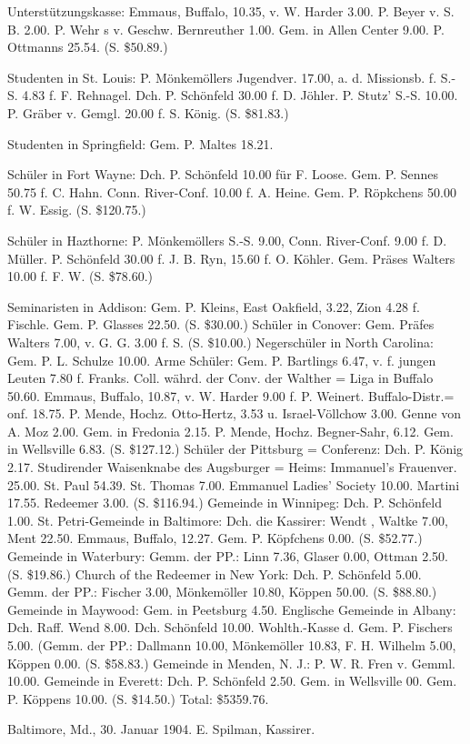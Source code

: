 Unterstützungskasse: Emmaus, Buffalo, 10.35, v. W. Harder 3.00. P. Beyer v. S. B. 2.00. P. Wehr s v. Geschw. Bernreuther 1.00. Gem. in Allen Center 9.00. P. Ottmanns 25.54. (S. \$50.89.)

Studenten in St. Louis: P. Mönkemöllers Jugendver. 17.00, a. d. Missionsb. f. S.-S. 4.83 f. F. Rehnagel. Dch. P. Schönfeld 30.00 f. D. Jöhler. P. Stutz’ S.-S. 10.00. P. Gräber v. Gemgl. 20.00 f. S. König. (S. \$81.83.)

Studenten in Springfield: Gem. P. Maltes 18.21.

Schüler in Fort Wayne: Dch. P. Schönfeld 10.00 für F. Loose. Gem. P. Sennes 50.75 f. C. Hahn. Conn. River-Conf. 10.00 f. A. Heine. Gem. P. Röpkchens 50.00 f. W. Essig. (S. \$120.75.)

Schüler in Hazthorne: P. Mönkemöllers S.-S. 9.00, Conn. River-Conf. 9.00 f. D. Müller. P. Schönfeld 30.00 f. J. B. Ryn, 15.60 f. O. Köhler. Gem. Präses Walters 10.00 f. F. W. (S. \$78.60.)


Seminaristen in Addison: Gem. P. Kleins, East Oakfield, 3.22, Zion 4.28 f. Fischle. Gem. P. Glasses 22.50. (S. \$30.00.)
Schüler in Conover: Gem. Präfes Walters 7.00, v. G. G. 3.00 f. S. (S. \$10.00.)
Negerschüler in North Carolina: Gem. P. L. Schulze 10.00.
Arme Schüler: Gem. P. Bartlings 6.47, v. f. jungen Leuten 7.80 f. Franks. Coll. währd. der Conv. der Walther = Liga in Buffalo 50.60. Emmaus, Buffalo, 10.87, v. W. Harder 9.00 f. P. Weinert. Buffalo-Distr.= onf. 18.75. P. Mende, Hochz. Otto-Hertz, 3.53 u. Israel-Völlchow 3.00. Genne von A. Moz 2.00. Gem. in Fredonia 2.15. P. Mende, Hochz. Begner-Sahr, 6.12. Gem. in Wellsville 6.83. (S. \$127.12.)
Schüler der Pittsburg = Conferenz: Dch. P. König 2.17.
Studirender Waisenknabe des Augsburger = Heims: Immanuel’s Frauenver. 25.00. St. Paul 54.39. St. Thomas 7.00. Emmanuel Ladies’ Society 10.00. Martini 17.55. Redeemer 3.00. (S. \$116.94.)
Gemeinde in Winnipeg: Dch. P. Schönfeld 1.00.
St. Petri-Gemeinde in Baltimore: Dch. die Kassirer: Wendt , Waltke 7.00, Ment 22.50. Emmaus, Buffalo, 12.27. Gem. P. Köpfchens 0.00. (S. \$52.77.)
Gemeinde in Waterbury: Gemm. der PP.: Linn 7.36, Glaser 0.00, Ottman 2.50. (S. \$19.86.)
Church of the Redeemer in New York: Dch. P. Schönfeld 5.00. Gemm. der PP.: Fischer 3.00, Mönkemöller 10.80, Köppen 50.00. (S. \$88.80.)
Gemeinde in Maywood: Gem. in Peetsburg 4.50.
Englische Gemeinde in Albany: Dch. Raff. Wend 8.00. Dch. Schönfeld 10.00. Wohlth.-Kasse d. Gem. P. Fischers 5.00. (Gemm. der PP.: Dallmann 10.00, Mönkemöller 10.83, F. H. Wilhelm 5.00, Köppen 0.00. (S. \$58.83.)
Gemeinde in Menden, N. J.: P. W. R. Fren v. Gemml. 10.00.
Gemeinde in Everett: Dch. P. Schönfeld 2.50. Gem. in Wellsville 00. Gem. P. Köppens 10.00. (S. \$14.50.) Total: \$5359.76.

Baltimore, Md., 30. Januar 1904. E. Spilman, Kassirer.
